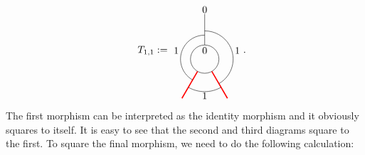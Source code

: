 \begin{equation}
\begin{tikzpicture}[scale=1,baseline=(current bounding box.center)]
		\end{tikzpicture}
		\hspace{5mm}
		T_{1,1}:=
		\begin{tikzpicture}[scale=1,baseline=(current bounding box.center)]
		\draw (0,0) circle (0.5cm);
		\draw[red,line width=0.4mm]
		\foreach \a in {-60, -120} {
			(\a:0.5) -- (\a:1.6)
		};
		\draw ([shift=(-60:1cm)]0,0) arc (-60:90:1cm);
		\draw ([shift=(-120:1.15cm)]0,0) arc (-120:-60:1.15cm);
		\draw ([shift=(240:0.85cm)]0,0) arc (240:90:0.85cm);
		\draw[] (90:0.5) -- (90:1.6);
		\node at (90:.3cm){$0$};\node at (90:1.75cm){$0$};
		\node at (-1,0.3) {$1$};
		\node at (1.15,0.3) {$1$};
		\node at (0,-1.3) {$1$};
		\end{tikzpicture}.
	\end{equation}
\noindent
The first morphism can be interpreted as the identity morphism and it obviously squares to itself. It is easy to see that the second and third diagrams square to the first. To square the final morphism, we need to do the following calculation:\vspace{5pt}
